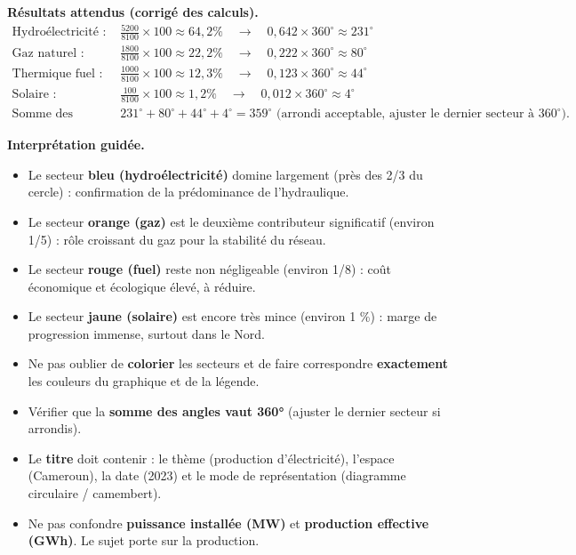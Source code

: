 \documentclass[11pt]{article}
\begin{document}
\begin{experience}
\textbf{Résultats attendus (corrigé des calculs).}
\begin{align*}
\text{Hydroélectricité : } & \frac{5200}{8100} \times 100 \approx 64,2\% \quad \rightarrow \quad 0,642 \times 360^{\circ} \approx 231^{\circ} \\
\text{Gaz naturel : } & \frac{1800}{8100} \times 100 \approx 22,2\% \quad \rightarrow \quad 0,222 \times 360^{\circ} \approx 80^{\circ} \\
\text{Thermique fuel : } & \frac{1000}{8100} \times 100 \approx 12,3\% \quad \rightarrow \quad 0,123 \times 360^{\circ} \approx 44^{\circ} \\
\text{Solaire : } & \frac{100}{8100} \times 100 \approx 1,2\% \quad \rightarrow \quad 0,012 \times 360^{\circ} \approx 4^{\circ} \\
\text{Somme des angles : } & 231^{\circ} + 80^{\circ} + 44^{\circ} + 4^{\circ} = 359^{\circ} \text{ (arrondi acceptable, ajuster le dernier secteur à } 360^{\circ}).
\end{align*}

\textbf{Interprétation guidée.}
\begin{itemize}
\item Le secteur \textbf{bleu (hydroélectricité)} domine largement (près des 2/3 du cercle) : confirmation de la prédominance de l'hydraulique.
\item Le secteur \textbf{orange (gaz)} est le deuxième contributeur significatif (environ 1/5) : rôle croissant du gaz pour la stabilité du réseau.
\item Le secteur \textbf{rouge (fuel)} reste non négligeable (environ 1/8) : coût économique et écologique élevé, à réduire.
\item Le secteur \textbf{jaune (solaire)} est encore très mince (environ 1 \%) : marge de progression immense, surtout dans le Nord.
\end{itemize}

\begin{attention}
\begin{itemize}
\item Ne pas oublier de \textbf{colorier} les secteurs et de faire correspondre \textbf{exactement} les couleurs du graphique et de la légende.
\item Vérifier que la \textbf{somme des angles vaut 360°} (ajuster le dernier secteur si arrondis).
\item Le \textbf{titre} doit contenir : le thème (production d'électricité), l'espace (Cameroun), la date (2023) et le mode de représentation (diagramme circulaire / camembert).
\item Ne pas confondre \textbf{puissance installée (MW)} et \textbf{production effective (GWh)}. Le sujet porte sur la production.
\end{itemize}
\end{attention}
\end{experience}
\end{document}
